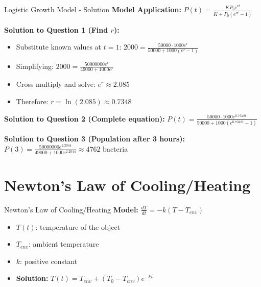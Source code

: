 \documentclass[10pt,aspectratio=169]{beamer}
\begin{document}
\begin{frame}{Logistic Growth Model - Solution}
    \textbf{Model Application:} $P(t) = \frac{KP_0 e^{rt}}{K + P_0 (e^{rt} - 1)}$
    
    \textbf{Solution to Question 1 (Find $r$):}
    \begin{itemize}
        \item Substitute known values at $t=1$: $2000 = \frac{50000 \cdot 1000 e^{r}}{50000 + 1000 (e^{r} - 1)}$
        \item Simplifying: $2000 = \frac{50000000 e^{r}}{49000 + 1000 e^{r}}$
        \item Cross multiply and solve: $e^r \approx 2.085$
        \item Therefore: $r = \ln(2.085) \approx 0.7348$
    \end{itemize}
    
    \textbf{Solution to Question 2 (Complete equation):}
    $P(t) = \frac{50000 \cdot 1000 e^{0.7348t}}{50000 + 1000 (e^{0.7348t} - 1)}$
    
    \textbf{Solution to Question 3 (Population after 3 hours):}
    $P(3) = \frac{50000000 e^{2.2044}}{49000 + 1000 e^{2.2044}} \approx 4762$ bacteria
\end{frame}

\section{Newton's Law of Cooling/Heating}
\begin{frame}{Newton's Law of Cooling/Heating}
    \textbf{Model:} $\frac{dT}{dt} = -k(T - T_{env})$
    \begin{itemize}
        \item $T(t)$: temperature of the object
        \item $T_{env}$: ambient temperature
        \item $k$: positive constant
        \item \textbf{Solution:} $T(t) = T_{env} + (T_0 - T_{env})e^{-kt}$
    \end{itemize}
\end{frame}
\end{document}
